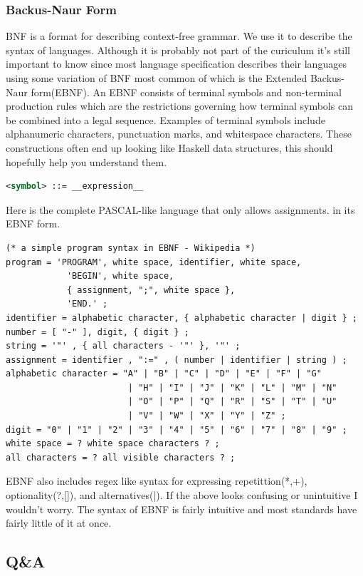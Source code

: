 \documentclass{article}
\begin{document}
        \subsubsection{Backus-Naur Form}
            \gls{BNF} is a format for describing context-free grammar. We use it to describe the syntax of languages. Although it is probably not part of the curiculum
            it's still important to know since most language specification describes their languages using some variation of BNF most common of which is the Extended Backus-Naur form(EBNF).
            An EBNF consists of terminal symbols and non-terminal production rules which are the restrictions governing how terminal symbols can be combined into a legal sequence. 
            Examples of terminal symbols include alphanumeric characters, punctuation marks, and whitespace characters. These constructions often end up looking like Haskell data structures,
            this should hopefully help you understand them.
            \begin{lstlisting}[language=XML]
<symbol> ::= __expression__
            \end{lstlisting}
            Here is the complete PASCAL-like language that only allows assignments. in its EBNF form.
            \begin{lstlisting}[language=XML]
(* a simple program syntax in EBNF - Wikipedia *)
program = 'PROGRAM', white space, identifier, white space, 
            'BEGIN', white space, 
            { assignment, ";", white space }, 
            'END.' ;
identifier = alphabetic character, { alphabetic character | digit } ;
number = [ "-" ], digit, { digit } ;
string = '"' , { all characters - '"' }, '"' ;
assignment = identifier , ":=" , ( number | identifier | string ) ;
alphabetic character = "A" | "B" | "C" | "D" | "E" | "F" | "G"
                        | "H" | "I" | "J" | "K" | "L" | "M" | "N"
                        | "O" | "P" | "Q" | "R" | "S" | "T" | "U"
                        | "V" | "W" | "X" | "Y" | "Z" ;
digit = "0" | "1" | "2" | "3" | "4" | "5" | "6" | "7" | "8" | "9" ;
white space = ? white space characters ? ;
all characters = ? all visible characters ? ;
            \end{lstlisting}
            EBNF also includes regex like syntax for expressing repetittion(*,+), optionality(?,[]), and alternatives(|).
            If the above looks confusing or unintuitive I wouldn't worry. The syntax of EBNF is fairly intuitive and most standards have fairly little of it at once.
        \subsection{Q\&A}
\end{document}
